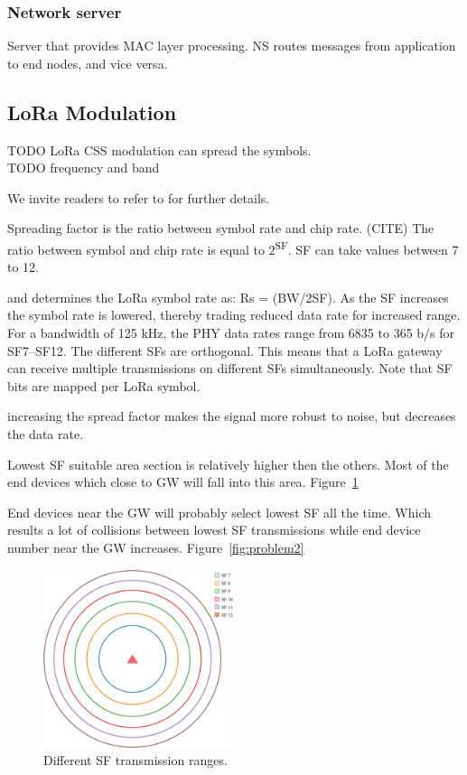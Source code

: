 \documentclass[conference]{IEEEtran}
\begin{document}
\subsubsection{Network server}
Server that provides MAC layer processing. NS routes messages from application to end nodes, and vice versa.

\subsection{LoRa Modulation}
\par TODO
LoRa CSS modulation can spread the symbols.\\
TODO frequency and band

We invite readers to refer to \cite{AN1200.22} for further details.

\par Spreading factor is the ratio between symbol rate and chip rate. (CITE) The ratio between symbol and chip rate is equal to $2$\textsuperscript{SF}. SF can take values between 7 to 12.

and determines the LoRa symbol rate as: Rs = (BW/2SF). As the SF increases the symbol rate is lowered, thereby trading reduced data rate for increased range. For a bandwidth of 125 kHz, the PHY data rates range from 6835 to 365 b/s for SF7–SF12. The different SFs are orthogonal. This means that a LoRa gateway can receive multiple transmissions on different SFs simultaneously. Note that SF bits are mapped per LoRa symbol.

increasing the spread factor makes the signal more robust to noise, but decreases the data rate.


\par Lowest SF suitable area section is relatively higher then the others. Most of the end devices which close to GW will fall into this area. Figure~\ref{fig:problem1}

\par End devices near the GW will probably select lowest SF all the time. Which results a lot of collisions between lowest SF transmissions while end device number near the GW increases. Figure~\ref{fig:problem2}

\begin{figure}
\centering
\includegraphics[width=0.5\textwidth]{lora0}
\caption{Different SF transmission ranges.}
\label{fig:problem1}
\end{figure}
\end{document}

